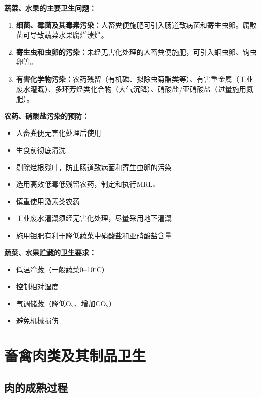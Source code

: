 \begin{keybox}
\textbf{蔬菜、水果的主要卫生问题：}
\begin{enumerate}[leftmargin=*]
    \item \textbf{细菌、霉菌及其毒素污染：}人畜粪便施肥可引入肠道致病菌和寄生虫卵。腐败菌可导致蔬菜水果腐烂溃烂。
    \item \textbf{寄生虫和虫卵的污染：}未经无害化处理的人畜粪便施肥，可引入蛔虫卵、钩虫卵等。
    \item \textbf{有害化学物污染：}农药残留（有机磷、拟除虫菊酯类等）、有害重金属（工业废水灌溉）、多环芳烃类化合物（大气沉降）、硝酸盐/亚硝酸盐（过量施用氮肥）。
\end{enumerate}

\textbf{农药、硝酸盐污染的预防：}
\begin{itemize}[leftmargin=*]
    \item 人畜粪便无害化处理后使用
    \item 生食前彻底清洗
    \item 剔除烂根残叶，防止肠道致病菌和寄生虫卵的污染
    \item 选用高效低毒低残留农药，制定和执行MRLs
    \item 慎重使用激素类农药
    \item 工业废水灌溉须经无害化处理，尽量采用地下灌溉
    \item 施用钼肥有利于降低蔬菜中硝酸盐和亚硝酸盐含量
\end{itemize}

\textbf{蔬菜、水果贮藏的卫生要求：}
\begin{itemize}[leftmargin=*]
    \item 低温冷藏（一般蔬菜0--10$^\circ$C）
    \item 控制相对湿度
    \item 气调储藏（降低O$_2$、增加CO$_2$）
    \item 避免机械损伤
\end{itemize}
\end{keybox}

\section{畜禽肉类及其制品卫生}

\subsection{肉的成熟过程}

